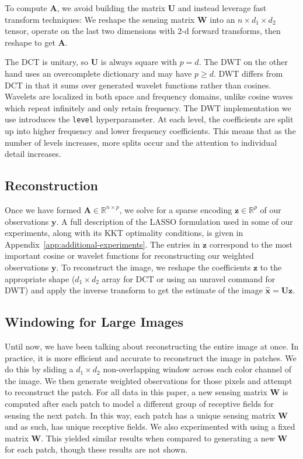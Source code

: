 \documentclass{article}
\renewcommand{\vec}{\mathbf}
\newcommand{\mat}{\mathbf}
\begin{document}
To compute $\mat A$, we avoid building the matrix $\mat U$ and instead leverage fast transform techniques:
We reshape the sensing matrix $\mat W$ into an $n \times d_1 \times d_2$ tensor, operate on the last two dimensions with 2-d forward transforms, then reshape to get $\mat A$.

The DCT is unitary, so $\mat U$ is always square with $p = d$.
The DWT on the other hand uses an overcomplete dictionary and may have $p \geq d$.
DWT differs from DCT in that it sums over generated wavelet functions rather than cosines.
Wavelets are localized in both space and frequency domains, unlike cosine waves which repeat infinitely and only retain frequency.
The DWT implementation we use \cite{dwtpak} introduces the  \texttt{level} hyperparameter.
At each level, the coefficients are split up into higher frequency and lower frequency coefficients.
This means that as the number of levels increases, more splits occur and the attention to individual detail increases.


\subsection{Reconstruction}
Once we have formed $\mat A \in \mathbb{R}^{n \times p}$, we solve for a sparse encoding $\vec z \in \mathbb{R}^p$ of our observations $\vec y$.
A full description of the LASSO formulation used in some of our experiments, along with its KKT optimality conditions, is given in Appendix~\ref{app:additional-experiments}.
The entries in $\vec z$ correspond to the most important cosine or wavelet functions for reconstructing our weighted observations $\vec y$.
To reconstruct the image, we reshape the coefficients $\vec z$ to the appropriate shape ($d_1 \times d_2$ array for DCT or using an unravel command for DWT) and apply the inverse transform to get the estimate of the image $\hat{\vec x} = \mat U \vec z$.

\subsection{Windowing for Large Images}
Until now, we have been talking about reconstructing the entire image at once.
In practice, it is more efficient and accurate to reconstruct the image in patches.
We do this by sliding a $d_1 \times d_2$ non-overlapping window across each color channel of the image.
We then generate weighted observations for those pixels and attempt to reconstruct the patch.
For all data in this paper, a new sensing matrix $\mat W$ is computed after each patch to model a different group of receptive fields for sensing the next patch.
In this way, each patch has a unique sensing matrix $\mat W$ and as such, has unique receptive fields.
We also experimented with using a fixed matrix $\mat W$.
This yielded similar results when compared to generating a new $\mat W$ for each patch, though these results are not shown.
\end{document}
